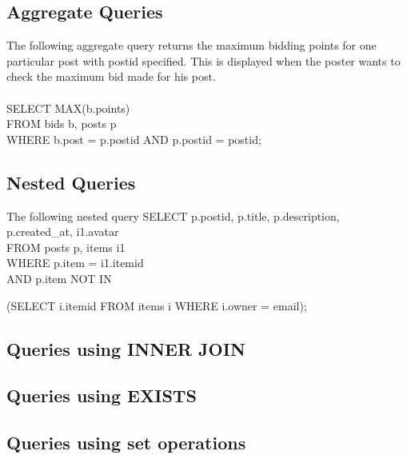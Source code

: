 \subsection{Aggregate Queries}
The following aggregate query returns the maximum bidding points for one particular post with postid specified. This is displayed when the poster wants to check the maximum bid made for his post.\\\\
SELECT MAX(b.points)\\
FROM bids b, posts p\\
WHERE b.post = p.postid AND p.postid = postid;

\subsection{Nested Queries}
The following nested query 
SELECT p.postid, p.title, p.description, p.created\_at, i1.avatar \\
FROM posts p, items i1 \\
WHERE p.item = i1.itemid\\
AND p.item NOT IN \\
\strut\hspace*{3ex} (SELECT i.itemid FROM items i WHERE i.owner = email);

\subsection{Queries using INNER JOIN}

\subsection{Queries using EXISTS}

\subsection{Queries using set operations}

